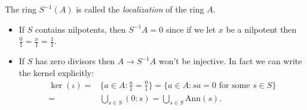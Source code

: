 \documentclass[12pt]{article}
\begin{document}
\begin{definition}
	The ring $S^{-1}(A)$ is called the \emph{localization} of the ring $A$.
\end{definition}

\begin{remark}
	\hfill 
	\begin{itemize}
		\item If $S$ contains nilpotents, then $S^{-1}A=0$ since if we let $x$ be a nilpotent then $\frac{0}{1} = \frac{x}{1}  = \frac{1}{1}$.
		\item If $S$ has zero divisors then $A\to S^{-1}A$ won't be injective. In fact we can write the kernel explicitly:
			\begin{align*}
				\ker(\iota) 
				=& \{a\in A : \frac{a}{1}=\frac{0}{1}\} = \{a\in A : sa=0 \text{ for some }s\in S \} \\
				=& \bigcup_{s\in S}(0:s) = \bigcup_{s\in S}\text{Ann}(s).
			\end{align*}
	\end{itemize}
\end{remark}
\end{document}
